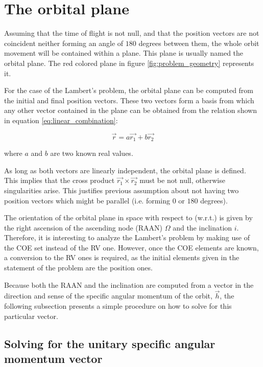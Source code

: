\section{The orbital plane}

Assuming that the time of flight is not null, and that the position vectors are
not coincident neither forming an angle of $180$ degrees between them, the whole
orbit movement will be contained within a plane. This plane is usually named the
orbital plane. The red colored plane in figure
\ref{fig:problem_geometry} represents it.

For the case of the Lambert's problem, the orbital plane can be computed
from the initial and final position vectors. These two vectors form a basis from
which any other vector contained in the plane can be obtained from the relation
shown in equation \ref{eq:linear_combination}:

\begin{equation}
  \vec{r} = a \vec{r_{1}} + b \vec{r_{2}}
  \label{eq:linear_combination}
\end{equation}

where $a$ and $b$ are two known real values.

As long as both vectors are linearly independent, the orbital plane is defined.
This implies that the cross product $\vec{r_{1}} \times \vec{r_{2}}$ must be not
null, otherwise singularities arise. This justifies previous assumption about
not having two position vectors which might be parallel (i.e. forming $0$ or
$180$ degrees).

The orientation of the orbital plane in space with respect to (w.r.t.) is given
by the right ascension of the ascending node (RAAN) $\Omega$ and the inclination
$i$. Therefore, it is interesting to analyze the Lambert's problem by making use
of the COE set instead of the RV one. However, once the COE elements are known,
a conversion to the RV ones is required, as the initial elements given in the
statement of the problem are the position ones.

Because both the RAAN and the inclination are computed from a vector in the
direction and sense of the specific angular momentum of the orbit, $\vec{h}$,
the following subsection presents a simple procedure on how to solve for this
particular vector.


\subsection{Solving for the unitary specific angular momentum vector}

